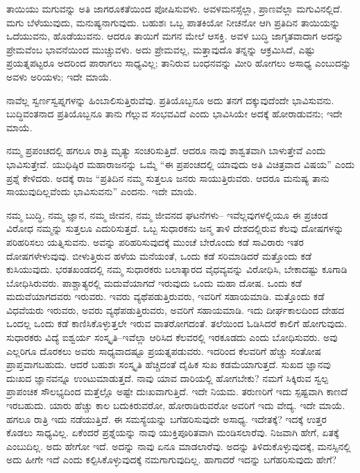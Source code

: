 \vskip 0.2cm

ತಾಯಿಯು ಮಗುವನ್ನು ಅತಿ ಜಾಗರೂಕತೆಯಿಂದ ಪೋಷಿಸುವಳು. ಅವಳ\break ಮನಸ್ಸೆಲ್ಲಾ, ಪ್ರಾಣವೆಲ್ಲಾ ಮಗುವಿನಲ್ಲಿದೆ. ಮಗು ಬೆಳೆಯುವುದು, ಮನುಷ್ಯನಾಗುವುದು. ಬಹುಶಃ ಒಬ್ಬ ಪಾತಕಿಯೋ ನೀಚನೋ ಆಗಿ ಪ್ರತಿದಿನ ತಾಯಿಯನ್ನು ಒದೆಯುವನು, ಹೊಡೆಯುವನು. ಆದರೂ ತಾಯಿಗೆ ಮಗನ ಮೇಲೆ ಆಸಕ್ತಿ. ಅವಳ ಬುದ್ಧಿ ಜಾಗೃತವಾದಾಗ ಅದನ್ನು ಪ್ರೇಮವೆಂಬ ಭಾವನೆಯಿಂದ ಮುಚ್ಚುವಳು. ಅದು ಪ್ರೇಮವಲ್ಲ, ಮತ್ತಾವುದೊ ತನ್ನನ್ನು ಆಕ್ರಮಿಸಿದೆ, ಎಷ್ಟು ಪ್ರಯತ್ನಪಟ್ಟರೂ ಅದರಿಂದ ಪಾರಾಗಲು ಸಾಧ್ಯವಿಲ್ಲ; ತಾನಿರುವ ಬಂಧನವನ್ನು ಮೀರಿ ಹೋಗಲು ಅಸಾಧ್ಯ ಎಂಬುದನ್ನು ಅವಳು ಅರಿಯಳು; ಇದೇ ಮಾಯೆ.

\vskip 0.2cm

ನಾವೆಲ್ಲ ಸ್ವರ್ಣಸ್ವಪ್ನಗಳನ್ನು ಹಿಂಬಾಲಿಸುತ್ತಿರುವೆವು. ಪ್ರತಿಯೊಬ್ಬನೂ ಅದು ತನಗೆ ದಕ್ಕುವುದೆಂದೇ ಭಾವಿಸುವನು. ಬುದ್ಧಿವಂತನಾದ ಪ್ರತಿಯೊಬ್ಬನೂ ತಾನು ಗೆಲ್ಲುವ ಸಂಭವವಿದೆ ಎಂದು ಭಾವಿಸಿಯೇ ಅದಕ್ಕೆ ಹೋರಾಡುವನು; ಇದೇ ಮಾಯೆ.

\vskip 0.2cm

ನಮ್ಮ ಪ್ರಪಂಚದಲ್ಲಿ ಹಗಲೂ ರಾತ್ರಿ ಮೃತ್ಯು ಸಂಚರಿಸುತ್ತಿದೆ. ಆದರೂ ನಾವು ಶಾಶ್ವತವಾಗಿ ಬಾಳುತ್ತೇವೆ ಎಂದು ಭಾವಿಸುತ್ತೇವೆ. ಯುಧಿಷ್ಠಿರ ಮಹಾರಾಜನನ್ನು ಒಮ್ಮೆ “ಈ ಪ್ರಪಂಚದಲ್ಲಿ ಯಾವುದು ಅತಿ ವಿಚಿತ್ರವಾದ ವಿಷಯ” ಎಂದು ಪ್ರಶ್ನೆ ಕೇಳಿದರು. ಅದಕ್ಕೆ ರಾಜ “ಪ್ರತಿದಿನ ನಮ್ಮ ಸುತ್ತಲೂ ಜನರು ಸಾಯುತ್ತಿರುವರು. ಆದರೂ ಮನುಷ್ಯ ತಾನು ಸಾಯುವುದಿಲ್ಲವೆಂದು ಭಾವಿಸುವನು” ಎಂದನು. ಇದೇ ಮಾಯೆ.


ನಮ್ಮ ಬುದ್ಧಿ, ನಮ್ಮ ಜ್ಞಾನ, ನಮ್ಮ ಜೀವನ, ನಮ್ಮ ಜೀವನದ ಘಟನೆಗಳು– ಇವೆಲ್ಲವುಗಳಲ್ಲಿಯೂ ಈ ಪ್ರಚಂಡ ವಿರೋಧ ನಮ್ಮನ್ನು ಸುತ್ತಲೂ ಎದುರಿಸುತ್ತದೆ. ಒಬ್ಬ ಸುಧಾರಕನು ಜನ್ಮ ತಾಳಿ ದೇಶದಲ್ಲಿರುವ ಕೆಲವು ದೋಷಗಳನ್ನು ಪರಿಹರಿಸಲು ಯತ್ನಿಸುವನು. ಅವನ್ನು ಪರಿಹರಿಸುವುದಕ್ಕೆ ಮುಂಚೆ ಬೇರೊಂದು ಕಡೆ ಸಾವಿರಾರು ಇತರ ದೋಷಗಳೇಳುವುವು. ಬೀಳುತ್ತಿರುವ ಹಳೆಯ ಮನೆಯಂತೆ, ಒಂದು ಕಡೆ ಸರಿಮಾಡಿದರೆ ಮತ್ತೊಂದು ಕಡೆ ಕುಸಿಯುವುದು. ಭರತಖಂಡದಲ್ಲಿ ನಮ್ಮ ಸುಧಾರಕರು ಬಲಾತ್ಕಾರದ ವೈಧವ್ಯವನ್ನು ವಿರೋಧಿಸಿ, ಬೇಕಾದಷ್ಟು ಕೂಗಾಡಿ ಬೋಧಿಸಿರುವರು. ಪಾಶ್ಚಾತ್ಯರಲ್ಲಿ ಮದುವೆಯಾಗದೆ ಇರುವುದು ಒಂದು ಮಹಾ ದೋಷ. ಒಂದು ಕಡೆ ಮದುವೆಯಾಗದವರು ಇರುವರು. ಇವರು ವ್ಯಥೆಪಡುತ್ತಿರುವರು, ಇವರಿಗೆ ಸಹಾಯಮಾಡಿ. ಮತ್ತೊಂದು ಕಡೆ ವಿಧವೆಯರು ಇರುವರು, ಅವರು ವ್ಯಥೆಪಡುತ್ತಿರುವರು, ಅವರಿಗೆ ಸಹಾಯಮಾಡಿ. ಇದು ದೀರ್ಘಕಾಲದಿಂದ ದೇಹದ ಒಂದಲ್ಲ ಒಂದು ಕಡೆ ಕಾಣಿಸಿಕೊಳ್ಳುತ್ತಲೇ ಇರುವ ವಾತರೋಗದಂತೆ. ತಲೆಯಿಂದ ಓಡಿಸಿದರೆ ಕಾಲಿಗೆ ಹೋಗುವುದು. ಸುಧಾರಕರು ವಿದ್ಯೆ ಐಶ್ವರ್ಯ ಸಂಸ್ಕೃತಿ–ಇವೆಲ್ಲಾ ಆರಿಸಿದ ಕೆಲವರಲ್ಲಿ ಇರಕೂಡದು ಎಂದು ಬೋಧಿಸುವರು. ಅವು ಎಲ್ಲರಿಗೂ ದೊರಕಲು ಅವರು ಸಾಧ್ಯವಾದಷ್ಟೂ ಪ್ರಯತ್ನಪಡುವರು. ಇದರಿಂದ ಕೆಲವರಿಗೆ ಹೆಚ್ಚು ಸಂತೋಷ ಪ್ರಾಪ್ತವಾಗಬಹುದು. ಆದರೆ ಬಹುಶಃ ಸಂಸ್ಕೃತಿ ಹೆಚ್ಚಿದಂತೆ ದೈಹಿಕ ಸುಖ ಕಡಮೆಯಾಗುತ್ತದೆ. ಸುಖದ ಜ್ಞಾನವು ದುಃಖದ ಜ್ಞಾನವನ್ನೂ ಉಂಟುಮಾಡುತ್ತದೆ. ನಾವು ಯಾವ ದಾರಿಯಲ್ಲಿ ಹೋಗಬೇಕು? ನಮಗೆ ಸಿಕ್ಕಿರುವ ಸ್ವಲ್ಪ ಪ್ರಾಪಂಚಿಕ ಸೌಲಭ್ಯದಿಂದ ಮತ್ತೆಲ್ಲೊ ಅಷ್ಟೇ ದುಃಖವಾಗುತ್ತಿದೆ. ಇದೇ ನಿಯಮ. ತರುಣರಿಗೆ ಇದು ಸ್ಪಷ್ಟವಾಗಿ ಕಾಣದೆ ಇರಬಹುದು. ಯಾರು ಹೆಚ್ಚು ಕಾಲ ಬದುಕಿರುವರೋ, ಹೋರಾಡಿರುವರೋ ಅವರಿಗೆ ಇದು ವೇದ್ಯ. ಇದೇ ಮಾಯೆ. ಹಗಲೂ ರಾತ್ರಿ ಇದು ನಡೆಯುತ್ತಿದೆ. ಈ ಸಮಸ್ಯೆಯನ್ನು ಬಗೆಹರಿಸುವುದೇ ಅಸಾಧ್ಯ. ಇದೇತಕ್ಕೆ? ಇದಕ್ಕೆ ಉತ್ತರ ಕೊಡಲು ಸಾಧ್ಯವಿಲ್ಲ. ಏಕೆಂದರೆ ಪ್ರಶ್ನೆಯನ್ನು ನಾವು ಯುಕ್ತಿಪೂರಿತವಾಗಿ ಮಂಡಿಸಲಾರೆವು. ನಿಜವಾಗಿ ಹೇಗೆ, ಏತಕ್ಕೆ ಎಂಬುದಿಲ್ಲ. ಅದು ಹೇಗೋ ಇದೆ. ಅದನ್ನು ನಾವು ಏನೂ ಮಾಡಲಾರೆವು. ಅದನ್ನು ತಿಳಿದುಕೊಳ್ಳುವುದಕ್ಕೆ, ಮನಸ್ಸಿನಲ್ಲಿ ಅದು ಹೀಗೇ ಇದೆ ಎಂದು ಕಲ್ಪಿಸಿಕೊಳ್ಳುವುದಕ್ಕೆ ನಮಗಾಗುವುದಿಲ್ಲ. ಹಾಗಾದರೆ ಇದನ್ನು ಬಗೆಹರಿಸುವುದು ಹೇಗೆ?

